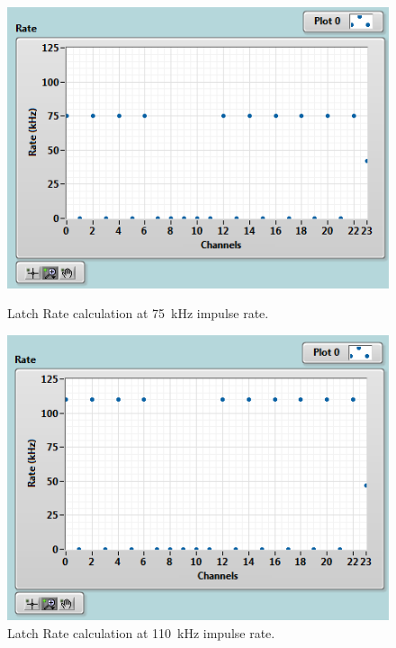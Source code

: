 \begin{figure}[H]
	\centering
	\begin{minipage}{0.49\textwidth}
		\centering
		\includegraphics[width=.95\linewidth]{IMG/ch5/latch_tests/fig9.PNG}
		\caption{Latch Rate calculation at 75~kHz impulse rate.}
		\label{fig:latchrate75}
	\end{minipage}%
	\begin{minipage}{0.49\textwidth}
		\centering
		\includegraphics[width=.95\linewidth]{IMG/ch5/latch_tests/fig12.PNG}
		\caption{Latch Rate calculation at 110~kHz impulse rate.}
		\label{fig:latchrate110}
	\end{minipage}
\end{figure}

